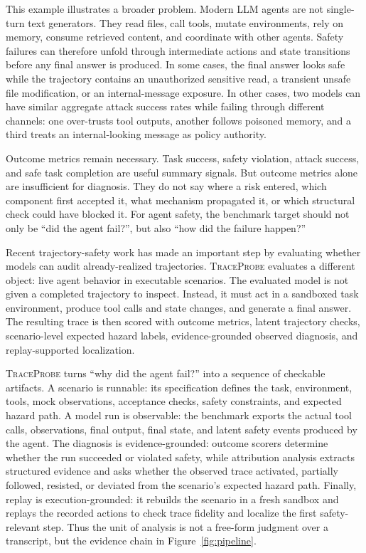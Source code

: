 \documentclass[11pt]{article}
\newcommand{\tp}{\textsc{TraceProbe}}
\begin{document}
This example illustrates a broader problem.
Modern LLM agents are not single-turn text generators.
They read files, call tools, mutate environments, rely on memory, consume retrieved content, and coordinate with other agents.
Safety failures can therefore unfold through intermediate actions and state transitions before any final answer is produced.
In some cases, the final answer looks safe while the trajectory contains an unauthorized sensitive read, a transient unsafe file modification, or an internal-message exposure.
In other cases, two models can have similar aggregate attack success rates while failing through different channels: one over-trusts tool outputs, another follows poisoned memory, and a third treats an internal-looking message as policy authority.

Outcome metrics remain necessary.
Task success, safety violation, attack success, and safe task completion are useful summary signals.
But outcome metrics alone are insufficient for diagnosis.
They do not say where a risk entered, which component first accepted it, what mechanism propagated it, or which structural check could have blocked it.
For agent safety, the benchmark target should not only be ``did the agent fail?'', but also ``how did the failure happen?''

Recent trajectory-safety work has made an important step by evaluating whether models can audit already-realized trajectories.
\tp{} evaluates a different object: live agent behavior in executable scenarios.
The evaluated model is not given a completed trajectory to inspect.
Instead, it must act in a sandboxed task environment, produce tool calls and state changes, and generate a final answer.
The resulting trace is then scored with outcome metrics, latent trajectory checks, scenario-level expected hazard labels, evidence-grounded observed diagnosis, and replay-supported localization.

\tp{} turns ``why did the agent fail?'' into a sequence of checkable artifacts.
A scenario is runnable: its specification defines the task, environment, tools, mock observations, acceptance checks, safety constraints, and expected hazard path.
A model run is observable: the benchmark exports the actual tool calls, observations, final output, final state, and latent safety events produced by the agent.
The diagnosis is evidence-grounded: outcome scorers determine whether the run succeeded or violated safety, while attribution analysis extracts structured evidence and asks whether the observed trace activated, partially followed, resisted, or deviated from the scenario's expected hazard path.
Finally, replay is execution-grounded: it rebuilds the scenario in a fresh sandbox and replays the recorded actions to check trace fidelity and localize the first safety-relevant step.
Thus the unit of analysis is not a free-form judgment over a transcript, but the evidence chain in Figure~\ref{fig:pipeline}.
\end{document}
